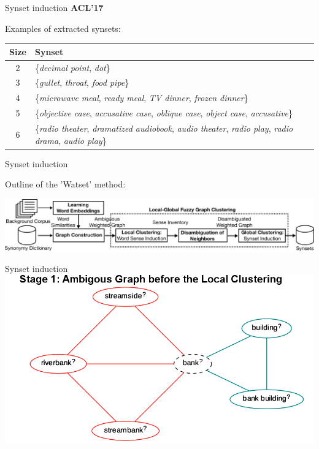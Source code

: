 

\begin{frame}{Synset induction}
	\textbf{ACL'17}~\cite{ustalov-panchenko-biemann:2017:Long}
	
	
\vspace{1em}
Examples of extracted synsets:
\vspace{1em}
\centering
\begin{tabular}{c|p{9cm}}
\textbf{Size} & \textbf{Synset}\\\hline
2 & \{\textit{decimal point}, \textit{dot}\}\\
3 & \{\textit{gullet}, \textit{throat}, \textit{food pipe}\}\\
4 & \{\textit{microwave meal}, \textit{ready meal}, \textit{TV dinner}, \textit{frozen dinner}\}\\
5 & \{\textit{objective case}, \textit{accusative case}, \textit{oblique case}, \textit{object case}, \textit{accusative}\}\\
6 & \{\textit{radio theater}, \textit{dramatized audiobook}, \textit{audio theater}, \textit{radio play}, \textit{radio drama}, \textit{audio play}\}\\
\end{tabular}


	
	
\end{frame}


\begin{frame}{Synset induction}
	
	
Outline of the 'Watset' method:

\vspace{2em}

\centering\includegraphics[width=1.05\textwidth]{figures/outline}
	
\end{frame}


\begin{frame}{Synset induction}
\centering\includegraphics[width=1\textwidth]{figures/stages1}	
\end{frame}



